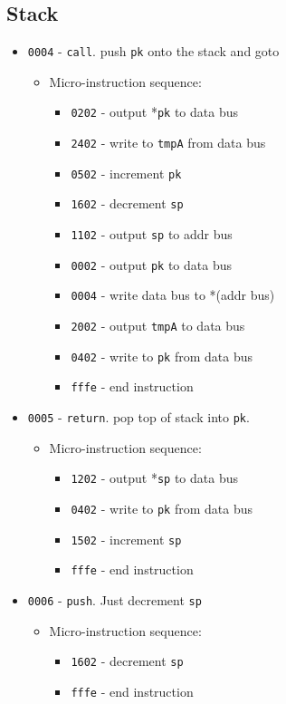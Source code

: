 \documentclass{article}
\def\pktodata{\Verb|0002| - output \Verb|pk| to data bus}
\def\pkptrout{\Verb|0202| - output *\Verb|pk| to data bus}
\def\datatopk{\Verb|0402| - write to \Verb|pk| from data bus}
\def\sptoaddr{\Verb|1102| - output \Verb|sp| to addr bus}
\def\spptodata{\Verb|1202| - output *\Verb|sp| to data bus}
\def\tmpatodata{\Verb|2002| - output \Verb|tmpA| to data bus}
\def\datatotmpa{\Verb|2402| - write to \Verb|tmpA| from data bus}
\def\incrementpk{\Verb|0502| - increment \Verb|pk|}
\def\incrementsp{\Verb|1502| - increment \Verb|sp|}
\def\decrementsp{\Verb|1602| - decrement \Verb|sp|}
\def\writeRAM{\Verb|0004| - write data bus to *(addr bus)}
\def\done{\Verb|fffe| - end instruction}
\begin{document}
\subsection{Stack}
\begin{itemize}
    \item \Verb|0004| - \Verb|call|. push \Verb|pk| onto the stack and goto
    \begin{itemize}
        \item Micro-instruction sequence:
        \begin{itemize}
            \item \pkptrout
            \item \datatotmpa
            \item \incrementpk
            \item \decrementsp
            \item \sptoaddr
            \item \pktodata
            \item \writeRAM
            \item \tmpatodata
            \item \datatopk
            \item \done
        \end{itemize}
    \end{itemize}

    \item \Verb|0005| - \Verb|return|. pop top of stack into \Verb|pk|.
    \begin{itemize}
        \item Micro-instruction sequence:
        \begin{itemize}
            \item \spptodata
            \item \datatopk
            \item \incrementsp
            \item \done
        \end{itemize}
    \end{itemize}

    \item \Verb|0006| - \Verb|push|. Just decrement \Verb|sp|
    \begin{itemize}
        \item Micro-instruction sequence:
        \begin{itemize}
            \item \decrementsp
            \item \done
        \end{itemize}
    \end{itemize}
    

\end{itemize}
\end{document}
